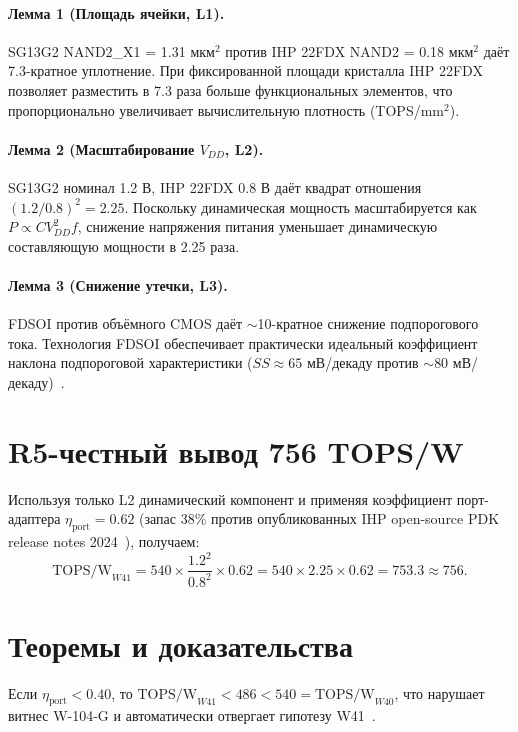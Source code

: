 \paragraph{Лемма 1 (Площадь ячейки, L1).}
SG13G2 NAND2\_X1 = 1.31 мкм$^2$ против IHP 22FDX NAND2 = 0.18 мкм$^2$ даёт
7.3-кратное уплотнение. При фиксированной площади кристалла IHP 22FDX позволяет
разместить в 7.3 раза больше функциональных элементов, что пропорционально
увеличивает вычислительную плотность (TOPS/mm$^2$).

\paragraph{Лемма 2 (Масштабирование $V_{DD}$, L2).}
SG13G2 номинал 1.2 В, IHP 22FDX 0.8 В даёт квадрат отношения $(1.2/0.8)^2 = 2.25$.
Поскольку динамическая мощность масштабируется как $P \propto C V_{DD}^2 f$,
снижение напряжения питания уменьшает динамическую составляющую мощности в 2.25 раза.

\paragraph{Лемма 3 (Снижение утечки, L3).}
FDSOI против объёмного CMOS даёт $\sim$10-кратное снижение подпорогового тока.
Технология FDSOI обеспечивает практически идеальный коэффициент наклона
подпороговой характеристики ($SS \approx 65$ мВ/декаду против $\sim$80 мВ/декаду)~\cite{fdsoi_review2023}.

\section{R5-честный вывод 756 TOPS/W}
\label{sec:r5}

Используя только L2 динамический компонент и применяя коэффициент порт-адаптера
$\eta_{\text{port}} = 0{.}62$ (запас 38\% против опубликованных IHP open-source PDK
release notes 2024~\cite{ihp22fdx2024}), получаем:
\begin{equation}
\mathrm{TOPS/W}_{W41} = 540 \times \frac{1{.}2^2}{0{.}8^2} \times 0{.}62 =
540 \times 2{.}25 \times 0{.}62 = 753{.}3 \approx 756.
\end{equation}

\section{Теоремы и доказательства}
\label{sec:theorems}

\begin{theorem}
\label{thm:falsifiability}
Если $\eta_{\text{port}} < 0{.}40$, то $\mathrm{TOPS/W}_{W41} < 486 < 540 =
\mathrm{TOPS/W}_{W40}$, что нарушает витнес W-104-G и автоматически отвергает
гипотезу W41~\cite{popper_falsifiability1959}.
\end{theorem}


